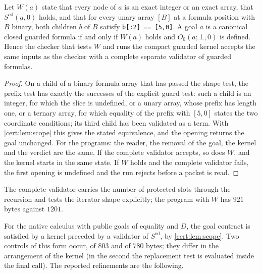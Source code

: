 \begin{theorem}\label{cert:thm:guarded-validator}
Let $W(a)$ state that every node of $a$ is an exact integer or an exact
array, that $S^{\mathrm{ed}}(a,0)$ holds, and that for every unary array
$[B]$ at a formula position with $B$ binary, both children $b$ of $B$ satisfy
\texttt{b[:2] == [5,0]}. A goal $a$ is a canonical closed guarded formula if
and only if $W(a)$ holds and $O_0(a;\bot,0)$ is defined. Hence the checker
that tests $W$ and runs the compact guarded kernel accepts the same inputs as
the checker with a complete separate validator of guarded formulas.
\end{theorem}
\begin{proof}
On a child of a binary formula array that has passed the shape test, the
prefix test has exactly the successes of the explicit guard test: such a
child is an integer, for which the slice is undefined, or a unary array,
whose prefix has length one, or a ternary array, for which equality of the
prefix with $[5,0]$ states the two coordinate conditions; its third child has
been validated as a term. With \cref{cert:lem:scope} this gives the stated
equivalence, and the opening returns the goal unchanged. For the programs:
the reader, the removal of the goal, the kernel and the verdict are the same.
If the complete validator accepts, so does $W$, and the kernel starts in the
same state. If $W$ holds and the complete validator fails, the first opening
is undefined and the run rejects before a packet is read.
\end{proof}

The complete validator carries the number of protected slots through the
recursion and tests the iterator shape explicitly; the program with $W$ has
$921$ bytes against $1201$.

For the native calculus with public goals of equality and $D$, the goal
contract is satisfied by a kernel preceded by a validator of
$S^{\mathrm{ed}}$, by \cref{cert:lem:scope}. Two controls of this form occur,
of $803$ and of $780$ bytes; they differ in the arrangement of the kernel
(in the second the replacement test is evaluated inside the final call).
The reported refinements are the following.

